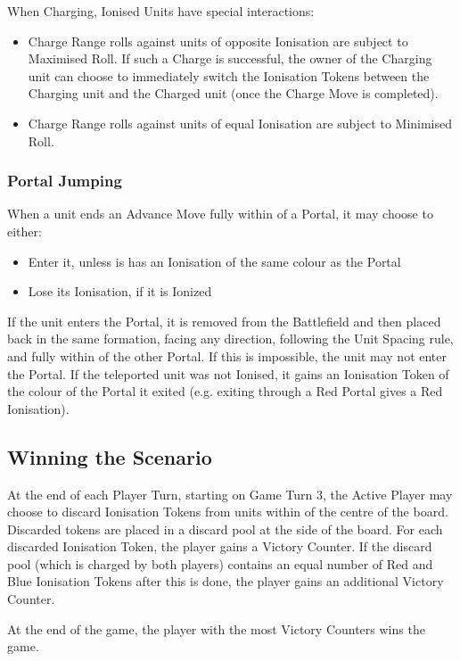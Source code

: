 When Charging, Ionised Units have special interactions:
\begin{itemize}%
	\item Charge Range rolls against units of opposite Ionisation are subject to Maximised Roll. If such a Charge is successful, the owner of the Charging unit can choose to immediately switch the Ionisation Tokens between the Charging unit and the Charged unit (once the Charge Move is completed).
	\item Charge Range rolls against units of equal Ionisation are subject to Minimised Roll.
\end{itemize}
	
\subsubsection*{Portal Jumping}

When a unit ends an Advance Move fully within  of a Portal, it may choose to either:
\begin{itemize}
	\item Enter it, unless is has an Ionisation of the same colour as the Portal
	\item Lose its Ionisation, if it is Ionized
\end{itemize}

If the unit enters the Portal, it is removed from the Battlefield and then placed back in the same formation, facing any direction, following the Unit Spacing rule, and fully within  of the other Portal. If this is impossible, the unit may not enter the Portal. If the teleported unit was not Ionised, it gains an Ionisation Token of the colour of the Portal it exited (e.g. exiting through a Red Portal gives a Red Ionisation).

\subsection*{Winning the Scenario}

At the end of each Player Turn, starting on Game Turn 3, the Active Player may choose to discard Ionisation Tokens from units within  of the centre of the board. Discarded tokens are placed in a discard pool at the side of the board. For each discarded Ionisation Token, the player gains a Victory Counter. If the discard pool (which is charged by both players) contains an equal number of Red and Blue Ionisation Tokens after this is done, the player gains an additional Victory Counter.

At the end of the game, the player with the most Victory Counters wins the game.
